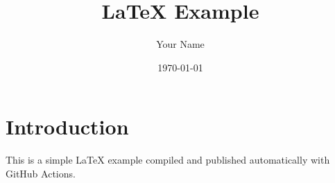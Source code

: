 \documentclass{article}
\title{LaTeX Example}
\author{Your Name}
\date{\today}
\begin{document}
\maketitle

\section{Introduction}

This is a simple \LaTeX{} example compiled and published automatically with GitHub Actions.
\end{document}
